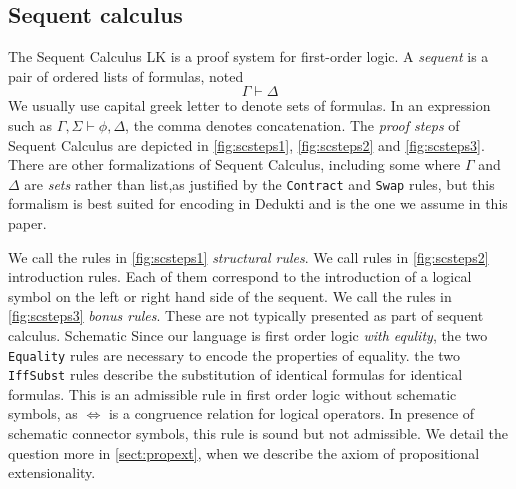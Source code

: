 \documentclass{article}
\begin{document}
	\iffalse
	We consider first order logic with arbitrary constant function and predicate symbols. Fomally We fix:
	\begin{itemize}
		\item a set of constant symbols $C$ noted $f^j, g^j, h^j, f^j_i,...$ for indices $i\in \mathbb{N}$ and where the superscript $j$ denotes the \textit{arity} of the symbol
		\item a countably infinite set of schematic function symbols $'C$ noted $ 'f^j, 'g^j, 'h^j, f^j_i,...$ for indices $i\in \mathbb{N}$ and where the superscript $j$ denotes the \textit{arity} of the symbol.
	\end{itemize}
	We also call schematic functions symbols of arity 0 \textit{variables}, and note them $x,y,z$.
	The set of terms of height at most $n$ is
	$$\mathcal{T}_0 := \lbrace f^0 \mid f^0 \in C\rbrace \cup \lbrace 'f^0 \mid 'f^0 \in C \rbrace$$
	$$\mathcal{T}_{n+1} := \mathcal{T}_n \cup \lbrace f^j(\vec{t}) \mid f^j\in \mathcal{C}, \vec{t}\in \mathcal{T}_n^j, j>0 \rbrace \cup \lbrace 'f^j(\vec{t}) \mid 'f^j\in \mathcal{C}, \vec{t}\in \mathcal{T}_n^j, j>0 \rbrace$$
	and the set of all termsis $\mathcal T = \bigcup_{n=0}^\infty \mathcal{T}_n$.  Moreover, we allow \textit{schematic functions, predicate and connector symbols}.
	
	\fi
	\subsection{Sequent calculus}\label{SSect:sequent-calculus}
	The Sequent Calculus LK is a proof system for first-order logic. A \textit{sequent} is a pair of ordered lists of formulas, noted
	$$
	\Gamma \vdash \Delta
	$$
	We usually use capital greek letter to denote sets of formulas. In an expression such as $\Gamma, \Sigma \vdash \phi, \Delta$, the comma denotes concatenation.
	The \textit{proof steps} of Sequent Calculus are depicted in \autoref{fig:scsteps1}, \autoref{fig:scsteps2} and \autoref{fig:scsteps3}. There are other formalizations of Sequent Calculus, including some where $\Gamma$ and $\Delta$ are \textit{sets} rather than list,as justified by the \texttt{Contract} and \texttt{Swap} rules, but this formalism is best suited for encoding in Dedukti and is the one we assume in this paper.

	We call the rules in \autoref{fig:scsteps1} \textit{structural rules}. We call rules in \autoref{fig:scsteps2} introduction rules. Each of them correspond to the introduction of a logical symbol on the left or right hand side of the sequent.
	We call the rules in \autoref{fig:scsteps3} \textit{bonus rules}. These are not typically presented as part of sequent calculus. 
	Schematic 	
	Since our language is first order logic \textit{with equlity}, the two \texttt{Equality} rules are necessary to encode the properties of equality. the two \texttt{IffSubst} rules describe the substitution of identical formulas for identical formulas. This is an admissible rule in first order logic without schematic symbols, as $\iff$ is a congruence relation for logical operators. In presence of schematic connector symbols, this rule is sound but not admissible. We detail the question more in \autoref{sect:propext}, when we describe the axiom of propositional extensionality.
	
\end{document}
